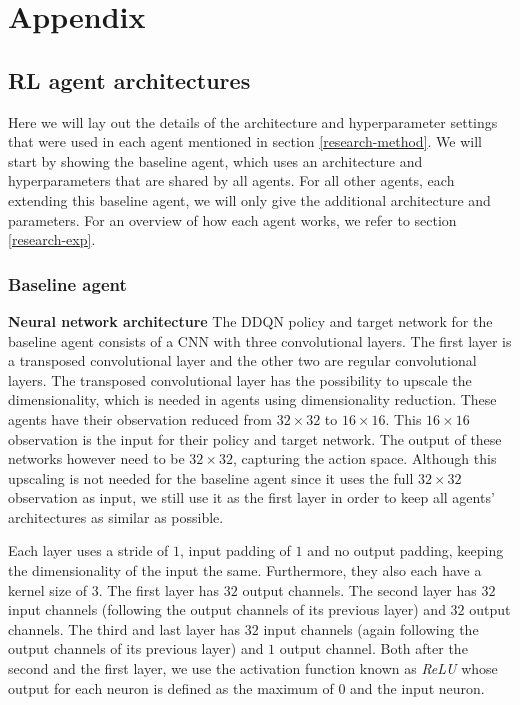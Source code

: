 \chapter{Appendix}\label{appendix}
\section{RL agent architectures}\label{appendix-agents}
Here we will lay out the details of the architecture and hyperparameter settings that were used in each agent mentioned in section \ref{research-method}. We will start by showing the baseline agent, which uses an architecture and hyperparameters that are shared by all agents. For all other agents, each extending this baseline agent, we will only give the additional architecture and parameters. For an overview of how each agent works, we refer to section \ref{research-exp}.


\subsection{Baseline agent}\label{appendix-baseline}
\textbf{Neural network architecture}\newline
\noindent The DDQN policy and target network for the baseline agent consists of a CNN with three convolutional layers. The first layer is a transposed convolutional layer \cite{transpose} and the other two are regular convolutional layers. The transposed convolutional layer has the possibility to upscale the dimensionality, which is needed in agents using dimensionality reduction. These agents have their observation reduced from $32 \times 32$ to $16 \times 16$. This $16 \times 16$ observation is the input for their policy and target network. The output of these networks however need to be $32 \times 32$, capturing the action space. Although this upscaling is not needed for the baseline agent since it uses the full $32 \times 32$ observation as input, we still use it as the first layer in order to keep all agents' architectures as similar as possible.

Each layer uses a stride of $1$, input padding of $1$ and no output padding, keeping the dimensionality of the input the same. Furthermore, they also each have a kernel size of $3$. The first layer has $32$ output channels. The second layer has $32$ input channels (following the output channels of its previous layer) and $32$ output channels. The third and last layer has $32$ input channels (again following the output channels of its previous layer) and $1$ output channel. Both after the second and the first layer, we use the activation function known as \emph{ReLU} \cite{relu} whose output for each neuron is defined as the maximum of $0$ and the input neuron.

